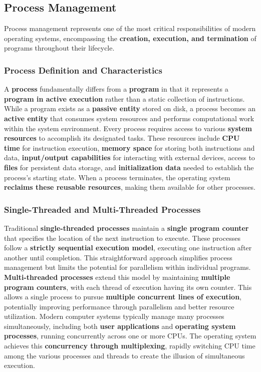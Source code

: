 \subsection{Process Management}

Process management represents one of the most critical responsibilities of modern operating systems, encompassing the \textbf{creation, execution, and termination} of programs throughout their lifecycle.


\subsubsection{Process Definition and Characteristics}

A \textbf{process} fundamentally differs from a \textbf{program} in that it represents a \textbf{program in active execution} rather than a static collection of instructions. While a program exists as a \textbf{passive entity} stored on disk, a process becomes an \textbf{active entity} that consumes system resources and performs computational work within the system environment.
Every process requires access to various \textbf{system resources} to accomplish its designated tasks. These resources include \textbf{CPU time} for instruction execution, \textbf{memory space} for storing both instructions and data, \textbf{input/output capabilities} for interacting with external devices, access to \textbf{files} for persistent data storage, and \textbf{initialization data} needed to establish the process's starting state. When a process terminates, the operating system \textbf{reclaims these reusable resources}, making them available for other processes.


\subsubsection{Single-Threaded and Multi-Threaded Processes}

Traditional \textbf{single-threaded processes} maintain a \textbf{single program counter} that specifies the location of the next instruction to execute. These processes follow a \textbf{strictly sequential execution model}, executing one instruction after another until completion. This straightforward approach simplifies process management but limits the potential for parallelism within individual programs.
\textbf{Multi-threaded processes} extend this model by maintaining \textbf{multiple program counters}, with each thread of execution having its own counter. This allows a single process to pursue \textbf{multiple concurrent lines of execution}, potentially improving performance through parallelism and better resource utilization.
Modern computer systems typically manage many processes simultaneously, including both \textbf{user applications} and \textbf{operating system processes}, running concurrently across one or more CPUs. The operating system achieves this \textbf{concurrency through multiplexing}, rapidly switching CPU time among the various processes and threads to create the illusion of simultaneous execution.


